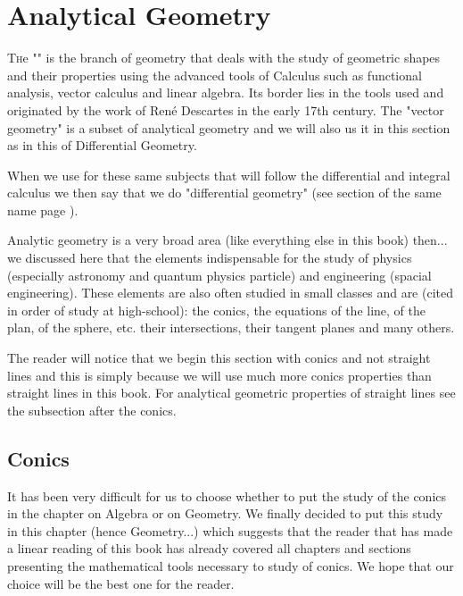 	\newpage
	\thispagestyle{empty}
	\mbox{}		
	\section{Analytical Geometry}

	\lettrine[lines=4]{\color{BrickRed}T}he "" is the branch of geometry that deals with the study of geometric shapes and their properties using the advanced tools of Calculus such as functional analysis, vector calculus and linear algebra. Its border lies in the tools used and originated by the work of René Descartes in the early 17th century. The "vector geometry" is a subset of analytical geometry and we will also us it in this section as in this of Differential Geometry.

	\begin{tcolorbox}[title=Remark,colframe=black,arc=10pt]
	When we use for these same subjects that will follow the differential and integral calculus we then say that we do "differential geometry" (see section of the same name page \pageref{differential geometry}).
	\end{tcolorbox}
	
	Analytic geometry is a very broad area (like everything else in this book) then... we discussed here that the elements indispensable for the study of physics (especially astronomy and quantum physics particle) and engineering (spacial engineering). These elements are also often studied in small classes and are (cited in order of study at high-school): the conics, the equations of the line, of the plan, of the sphere, etc. their intersections, their tangent planes and many others.	
	
	The reader will notice that we begin this section with conics and not straight lines and this is simply because we will use much more conics properties than straight lines in this book. For analytical geometric properties of straight lines see the subsection after the conics.

	\subsection{Conics}\label{conics}
	It has been very difficult for us to choose whether to put the study of the conics in the chapter on Algebra or on Geometry. We finally decided to put this study in this chapter (hence Geometry...) which suggests that the reader that has made a linear reading of this book has already covered all chapters and sections presenting the mathematical tools necessary to study of conics. We hope that our choice will be the best one for the reader.
	
